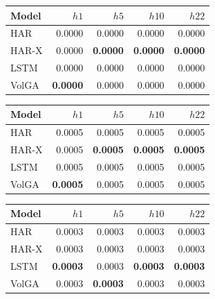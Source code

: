 

\begin{tabular}{lrrrr}
\toprule
Model & $h1$ & $h5$ & $h10$ & $h22$ \\
\midrule
HAR & 0.0000 & 0.0000 & 0.0000 & 0.0000 \\
HAR-X & 0.0000 & \textbf{0.0000} & \textbf{0.0000} & \textbf{0.0000} \\
LSTM & 0.0000 & 0.0000 & 0.0000 & 0.0000 \\
VolGA & \textbf{0.0000} & 0.0000 & 0.0000 & 0.0000 \\
\bottomrule
\end{tabular}

\begin{tabular}{lrrrr}
\toprule
Model & $h1$ & $h5$ & $h10$ & $h22$ \\
\midrule
HAR & 0.0005 & 0.0005 & 0.0005 & 0.0005 \\
HAR-X & 0.0005 & \textbf{0.0005} & \textbf{0.0005} & \textbf{0.0005} \\
LSTM & 0.0005 & 0.0005 & 0.0005 & 0.0005 \\
VolGA & \textbf{0.0005} & 0.0005 & 0.0005 & 0.0005 \\
\bottomrule
\end{tabular}

\begin{tabular}{lrrrr}
\toprule
Model & $h1$ & $h5$ & $h10$ & $h22$ \\
\midrule
HAR & 0.0003 & 0.0003 & 0.0003 & 0.0003 \\
HAR-X & 0.0003 & 0.0003 & 0.0003 & 0.0003 \\
LSTM & \textbf{0.0003} & 0.0003 & \textbf{0.0003} & \textbf{0.0003} \\
VolGA & 0.0003 & \textbf{0.0003} & 0.0003 & 0.0003 \\
\bottomrule
\end{tabular}

